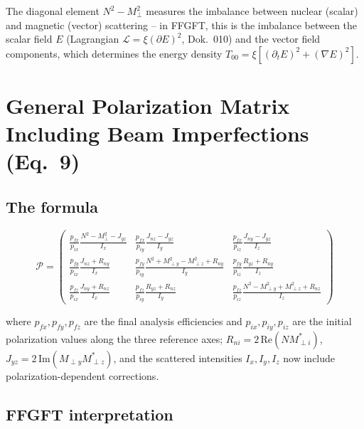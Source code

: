 The diagonal element $N^2 - M_\perp^2$ measures the imbalance between nuclear
(scalar) and magnetic (vector) scattering -- in FFGFT, this is the imbalance
between the scalar field $E$ (Lagrangian $\mathcal{L}=\xi(\partial E)^2$,
Dok.~010) and the vector field components, which determines the energy density
$T_{00} = \xi[(\partial_t E)^2 + (\nabla E)^2]$.

\section{General Polarization Matrix Including Beam Imperfections (Eq.~9)}

\subsection*{The formula}

\begin{equation}
  \mathcal{P} =
  \begin{pmatrix}
    \frac{p_{fx}}{p_{ix}}\frac{N^2-M_\perp^2-J_{yz}}{I_x} &
    \frac{p_{fx}}{p_{iy}}\frac{J_{nz}-J_{yz}}{I_y} &
    \frac{p_{fx}}{p_{iz}}\frac{J_{ny}-J_{yz}}{I_z} \\[6pt]
    \frac{p_{fy}}{p_{ix}}\frac{J_{nz}+R_{ny}}{I_x} &
    \frac{p_{fy}}{p_{iy}}\frac{N^2+M_{\perp y}^2-M_{\perp z}^2+R_{ny}}{I_y} &
    \frac{p_{fy}}{p_{iz}}\frac{R_{yz}+R_{ny}}{I_z} \\[6pt]
    \frac{p_{fz}}{p_{ix}}\frac{J_{ny}+R_{nz}}{I_x} &
    \frac{p_{fz}}{p_{iy}}\frac{R_{yz}+R_{nz}}{I_y} &
    \frac{p_{fz}}{p_{iz}}\frac{N^2-M_{\perp y}^2+M_{\perp z}^2+R_{nz}}{I_z}
  \end{pmatrix}
  \tag{Paper~Eq.~9}
\end{equation}

\noindent where $p_{fx}, p_{fy}, p_{fz}$ are the final analysis efficiencies
and $p_{ix}, p_{iy}, p_{iz}$ are the initial polarization values along the
three reference axes; $R_{ni} = 2\,\mathrm{Re}(NM_{\perp i}^*)$,
$J_{yz} = 2\,\mathrm{Im}(M_{\perp y}M_{\perp z}^*)$, and the scattered
intensities $I_x, I_y, I_z$ now include polarization-dependent corrections.

\subsection*{FFGFT interpretation}

